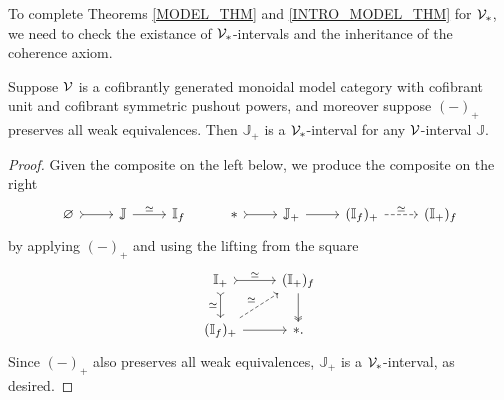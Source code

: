 \documentclass[a4paper,10pt
,draft
]{article}%
\newcommand{\I}{\mathbb I}
\newcommand{\J}{\mathbb J}
\renewcommand{\1}{\eta}%
\begin{document}
To complete Theorems \ref{MODEL_THM} and \ref{INTRO_MODEL_THM} for $\V_{\**}$, we need to check the existance of $\V_{\**}$-intervals and the inheritance of the coherence axiom.

\begin{proposition}
      \label{VPT_INT_PROP}
      Suppose $\mathcal V$ is a cofibrantly generated monoidal model category with cofibrant unit and cofibrant symmetric pushout powers,
      and moreover suppose $(-)_+$ preserves all weak equivalences.
      Then $\J_+$ is a $\V_{\**}$-interval for any $\mathcal V$-interval $\J$.
\end{proposition}
\begin{proof}
      Given the composite on the left below, we produce the composite on the right
      \begin{equation}
            \begin{tikzcd}
                  \varnothing \arrow[r, rightarrowtail]
                  &
                  \J \arrow[r, "\simeq"]
                  &
                  \I_f
                  & %
                  \** \arrow[r, rightarrowtail]
                  &
                  \J_+ \arrow[r]
                  &
                  (\I_f)_+ \arrow[r, dashed, "\simeq"]
                  &
                  (\I_+)_f
            \end{tikzcd}
      \end{equation}
      by applying $(-)_+$ and using the lifting from the square
      \begin{equation}
            \label{IFP_IPF_EQ}
            \begin{tikzcd}
                  \I_+ \arrow[d, rightarrowtail, "\simeq"'] \arrow[r, rightarrowtail, "\simeq"]
                  &
                  (\I_+)_f \arrow[d, twoheadrightarrow]
                  \\
                  (\I_f)_+ \arrow[ur, dashed, "\simeq"] \arrow[r]
                  &
                  \**.
            \end{tikzcd}
      \end{equation}
      Since $(-)_+$ also preserves all weak equivalences, $\J_+$ is a $\V_{\**}$-interval, as desired.
\end{proof}
\end{document}
